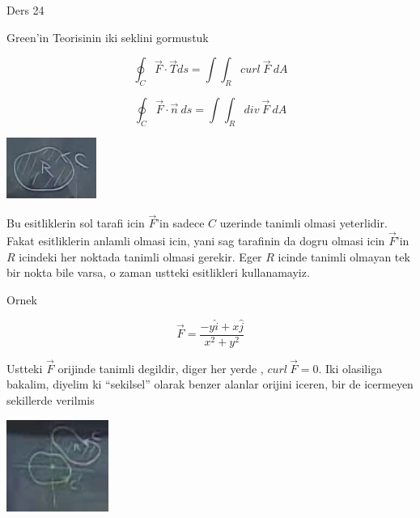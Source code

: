 \documentclass[12pt,fleqn]{article}
\begin{document}
Ders 24

Green'in Teorisinin iki seklini gormustuk

\[ \oint_C \vec{F} \cdot \vec{T} ds = \int \int_R curl \ \vec{F} \ dA \]

\[ \oint_C \vec{F} \cdot \vec{n} \ ds = \int \int_R div \ \vec{F} \ dA \]


\includegraphics[height=2cm]{24_1.png}

Bu esitliklerin sol tarafi icin $\vec{F}$'in sadece $C$ uzerinde tanimli
olmasi yeterlidir. Fakat esitliklerin anlamli olmasi icin, yani sag
tarafinin da dogru olmasi icin $\vec{F}$'in $R$ icindeki her noktada tanimli
olmasi gerekir. Eger $R$ icinde tanimli olmayan tek bir nokta bile varsa, o
zaman ustteki esitlikleri kullanamayiz.

Ornek 

\[ \vec{F} = \frac{ -y\hat{i} + x\hat{j}}{x^2+y^2} \]

Ustteki $\vec{F}$ orijinde tanimli degildir, diger her yerde , $curl \
\vec{F} = 0$. 
Iki olasiliga bakalim, diyelim ki ``sekilsel'' olarak benzer alanlar orijini
iceren, bir de icermeyen sekillerde verilmis

\includegraphics[height=3cm]{24_2.png}

 
\end{document}
